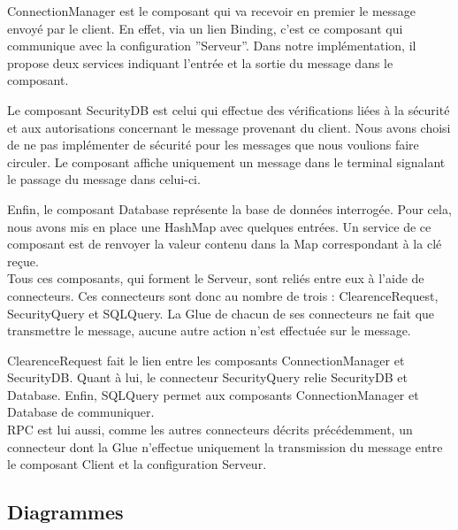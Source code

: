 \documentclass[11pt,a4paper]{article}
\begin{document}
ConnectionManager est le composant qui va recevoir en premier le message envoyé
par le client. En effet, via un lien Binding, c'est ce composant qui communique
avec la configuration ''Serveur''. Dans notre implémentation, il propose deux
services indiquant l'entrée et la sortie du message dans le composant.

Le composant SecurityDB est celui qui effectue des vérifications liées à
la sécurité et aux autorisations concernant le message provenant du client.
Nous avons choisi de ne pas implémenter de sécurité pour les messages que nous
voulions faire circuler. Le composant affiche uniquement un message dans le
terminal signalant le passage du message dans celui-ci. 

Enfin, le composant Database représente la base de données interrogée. Pour
cela, nous avons mis en place une HashMap avec quelques entrées. Un service de
ce composant est de renvoyer la valeur contenu dans la Map correspondant à la
clé reçue.\\

Tous ces composants, qui forment le Serveur, sont reliés entre eux à l'aide de
connecteurs. Ces connecteurs sont donc au nombre de trois : ClearenceRequest,
SecurityQuery et SQLQuery. La Glue de chacun de ses connecteurs ne fait que
transmettre le message, aucune autre action n'est effectuée sur le message.

ClearenceRequest fait le lien entre les composants ConnectionManager et
SecurityDB. Quant à lui, le connecteur SecurityQuery relie SecurityDB et
Database. Enfin, SQLQuery permet aux composants ConnectionManager et Database
de communiquer.\\

RPC est lui aussi, comme les autres connecteurs décrits précédemment, un
connecteur dont la Glue n'effectue uniquement la transmission du message entre
le composant Client et la configuration Serveur.

\clearpage
\subsection{Diagrammes}
\end{document}
